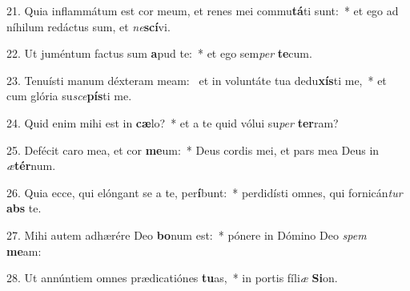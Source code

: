21. Quia inflammátum est cor meum, et renes mei commu\textbf{tá}ti sunt:~*  et ego ad níhilum redáctus sum, et \textit{ne}\textbf{scí}vi.\

22. Ut juméntum factus sum \textbf{a}pud te:~*  et ego sem\textit{per} \textbf{te}cum.\

23. Tenuísti manum déxteram meam: \dag\  et in voluntáte tua dedu\textbf{xís}ti me,~*  et cum glória su\textit{sce}\textbf{pís}ti me.\

24. Quid enim mihi est in \textbf{cæ}lo?~*  et a te quid vólui su\textit{per} \textbf{ter}ram?\

25. Defécit caro mea, et cor \textbf{me}um:~*  Deus cordis mei, et pars mea Deus in \textit{æ}\textbf{tér}num.\

26. Quia ecce, qui elóngant se a te, per\textbf{í}bunt:~*  perdidísti omnes, qui fornicán\textit{tur} \textbf{abs} te.\

27. Mihi autem adhærére Deo \textbf{bo}num est:~*  pónere in Dómino Deo \textit{spem} \textbf{me}am:\

28. Ut annúntiem omnes prædicatiónes \textbf{tu}as,~*  in portis fíli\textit{æ} \textbf{Si}on.\

